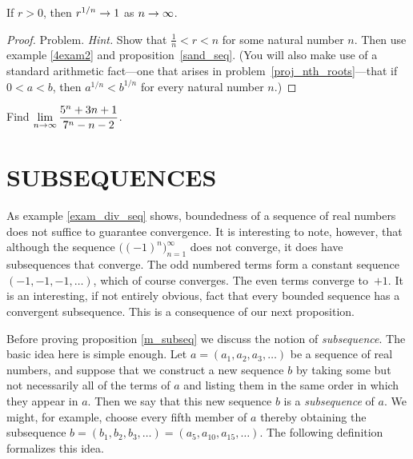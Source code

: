 \begin{prop} If $r > 0$, then $r^{1/n} \rightarrow 1$ as $n \rightarrow \infty$.
\end{prop}

\begin{proof} Problem.  \emph{Hint.}  Show that $\frac1n < r < n$ for some natural number $n$.
Then use example \ref{4exam2} and proposition~\ref{sand_seq}.  (You will also make use of a
standard arithmetic fact---one that arises in problem~\ref{proj_nth_roots}---that if $0 < a <
b$, then $a^{1/n} < b^{1/n}$ for every natural number $n$.)   \ns
\end{proof}

\begin{prob} Find $\displaystyle\lim_{n \rightarrow \infty}\frac{5^n + 3n + 1}{7^n - n - 2}$.
\end{prob}











\section{SUBSEQUENCES}

As example \ref{exam_div_seq} shows, boundedness of a sequence of real numbers does not
suffice to guarantee convergence.  It is interesting to note, however, that although the
sequence $\bigl((-1)^n\bigr)_{n=1}^\infty$ does not converge, it does have subsequences that
converge.  The odd numbered terms form a constant sequence $(-1,-1,-1,\dots)$, which of course
converges.  The even terms converge to~$+1$.  It is an interesting, if not entirely obvious,
fact that every bounded sequence has a convergent subsequence.  This is a consequence of our
next proposition.

Before proving proposition \ref{m_subseq} we discuss the notion of \emph{subsequence}. The
basic idea here is simple enough. Let $a = (a_1, a_2, a_3, \dots )$ be a sequence of real
numbers, and suppose that we construct a new sequence $b$ by taking some but not necessarily
all of the terms of $a$ and listing them in the same order in which they appear in $a$. Then
we say that this new sequence $b$ is a \emph{subsequence} of $a$.  We might, for example,
choose every fifth member of $a$ thereby obtaining the subsequence $b = (b_1, b_2, b_3, \dots
) = (a_5, a_{10}, a_{15}, \dots )$.  The following definition formalizes this idea.

